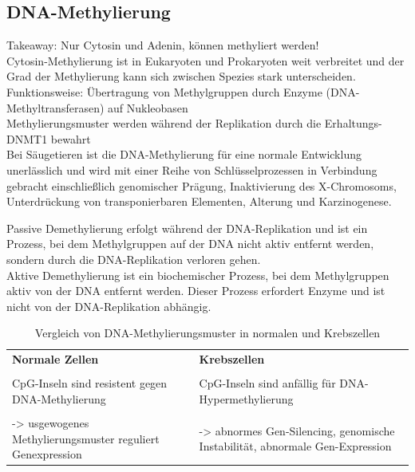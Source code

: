 \subsection{DNA-Methylierung}  
Takeaway: Nur Cytosin und Adenin, können methyliert werden! \\
Cytosin-Methylierung ist in Eukaryoten und Prokaryoten weit verbreitet und der Grad der Methylierung kann sich zwischen Spezies stark unterscheiden. \\ 
Funktionsweise: Übertragung von Methylgruppen durch Enzyme (DNA-Methyltransferasen) auf Nukleobasen \\
Methylierungsmuster werden während der Replikation durch die Erhaltungs-DNMT1 bewahrt \\ \newline {}  
Bei Säugetieren ist die DNA-Methylierung für eine normale Entwicklung unerlässlich und wird mit einer Reihe von Schlüsselprozessen in Verbindung gebracht einschließlich genomischer Prägung, Inaktivierung des X-Chromosoms, Unterdrückung von transponierbaren Elementen, Alterung und Karzinogenese.
\begin{mybox}[title=Passive und aktive Demythilierung]
Passive Demethylierung erfolgt während der DNA-Replikation und ist ein Prozess, bei dem Methylgruppen auf der DNA nicht aktiv entfernt werden, sondern durch die DNA-Replikation verloren gehen. \\
Aktive Demethylierung ist ein biochemischer Prozess, bei dem Methylgruppen aktiv von der DNA entfernt werden. Dieser Prozess erfordert Enzyme und ist nicht von der DNA-Replikation abhängig.  
\end{mybox}
\begin{table}[H]
    \begin{tabular}{p{8cm}p{8cm}}
        \textbf{Normale Zellen} & \textbf{Krebszellen}  \\ \\
        CpG-Inseln sind resistent gegen DNA-Methylierung & CpG-Inseln sind anfällig für DNA-Hypermethylierung \\ \\
        -> usgewogenes Methylierungsmuster reguliert Genexpression & -> abnormes Gen-Silencing, genomische Instabilität, abnormale Gen-Expression 
    \end{tabular}
    \caption{Vergleich von DNA-Methylierungsmuster in normalen und Krebszellen}
    \label{tab:methylierungkrebs}
\end{table}  
